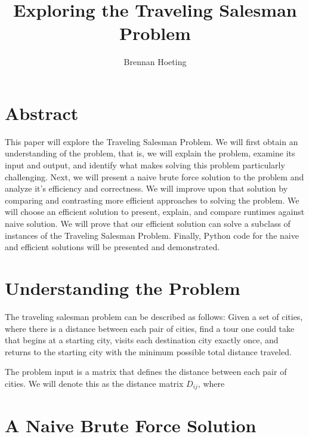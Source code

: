 \documentclass{article}
\begin{document}
\title{Exploring the Traveling Salesman Problem}
\author{Brennan Hoeting}
\date{}
\maketitle 

\section*{Abstract}
This paper will explore the Traveling Salesman Problem.
We will first obtain an understanding of the problem, that
is, we will explain the problem, examine its input and output,
and identify what makes solving this problem particularly
challenging.  Next, we will present a naive brute force solution
to the problem and analyze it's efficiency and correctness.  We
will improve upon that solution by comparing and contrasting
more efficient approaches to solving the problem.  We will choose
an efficient solution to present, explain, and compare runtimes
against naive solution.  We will prove that our efficient solution
can solve a subclass of instances of the Traveling Salesman Problem.
Finally, Python code for the naive and efficient solutions will be
presented and demonstrated.

\section*{Understanding the Problem}
The traveling salesman problem can be described as follows:
Given a set of cities, where there is a distance between
each pair of cities, find a tour one could take that 
begins at a starting city, visits each destination city
exactly once, and returns to the starting city with the
minimum possible total distance traveled. \par

The problem input is a matrix that defines the distance
between each pair of cities.  We will denote this as
the distance matrix $D_{ij}$, where 


\section*{A Naive Brute Force Solution}


  
\end{document}
